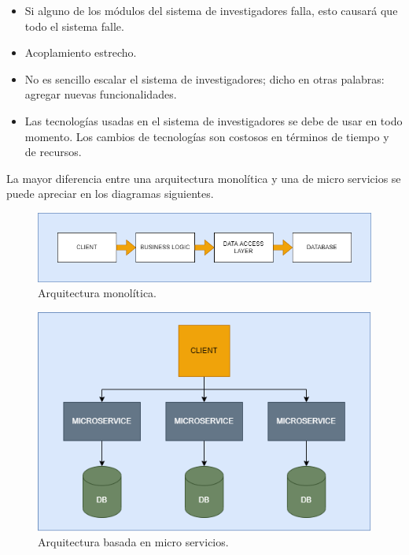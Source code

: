     \begin{itemize}
        \item Si alguno de los módulos del sistema de investigadores falla, esto causará que todo el sistema falle.
        \item Acoplamiento estrecho.
        \item No es sencillo escalar el sistema de investigadores; dicho en otras palabras: agregar nuevas funcionalidades.
        \item Las tecnologías usadas en el sistema de investigadores se debe de usar en todo momento. Los cambios de tecnologías son costosos en términos de tiempo y de recursos.
    \end{itemize}
    
    La mayor diferencia entre una arquitectura monolítica y una de micro servicios se puede apreciar en los diagramas siguientes.
    
    \begin{figure}[H]
        \centering
        \includegraphics[width=\textwidth]{Propuesta_Plantilla_Tesis_LaTeX_UAG/imagenes/monolitico.png}
        \caption{Arquitectura monolítica.\cite{KryptonSolid}}
        \label{fig:galaxy}
    \end{figure}
    
    \begin{figure}[H]
        \centering
        \includegraphics[width=\textwidth]{Propuesta_Plantilla_Tesis_LaTeX_UAG/imagenes/microservicios.png}
        \caption{Arquitectura basada en micro servicios.\cite{KryptonSolid}}
        \label{fig:galaxy}
    \end{figure}

